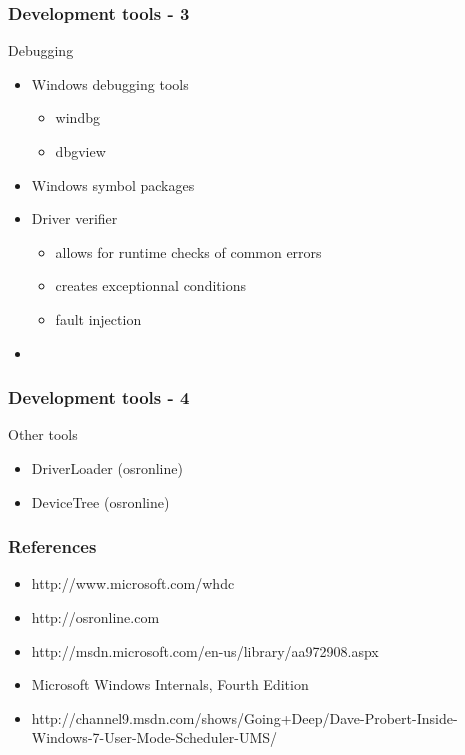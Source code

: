 \begin{frame}
 \frametitle{Development tools - 3}

 Debugging

 \begin{itemize}

  \item Windows debugging tools
  \begin{itemize}
   \item windbg 
   \item dbgview
  \end{itemize}

  \item Windows symbol packages

  \item Driver verifier
   \begin{itemize}
    \item allows for runtime checks of common errors
    \item creates exceptionnal conditions
    \item fault injection
   \end{itemize}
  \item

 \end{itemize}

\end{frame}


\begin{frame}
 \frametitle{Development tools - 4}

 Other tools

 \begin{itemize}
  \item DriverLoader (osronline)
  \item DeviceTree (osronline)
 \end{itemize}
\end{frame}


\begin{frame}
 \frametitle{References}

 \begin{itemize}
  \item http://www.microsoft.com/whdc
  \item http://osronline.com
  \item http://msdn.microsoft.com/en-us/library/aa972908.aspx
  \item Microsoft Windows Internals, Fourth Edition
  \item http://channel9.msdn.com/shows/Going+Deep/Dave-Probert-Inside-Windows-7-User-Mode-Scheduler-UMS/
 \end{itemize}

\end{frame}


